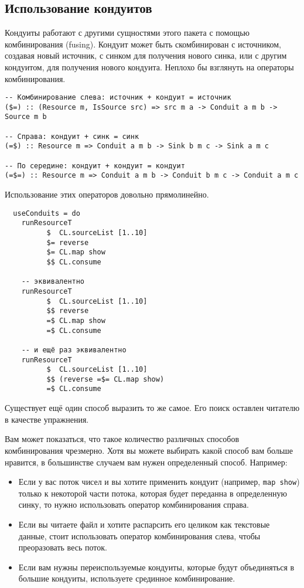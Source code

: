 \subsection{Использование кондуитов}
Кондуиты работают с другими сущностями этого пакета с помощью комбинирования (fusing).
Кондуит может быть скомбинирован с источником, создавая новый источник, 
с синком для получения нового синка, или с другим кондуитом, для получения 
нового кондуита. Неплохо бы взглянуть на операторы комбинирования. 
\begin{lstlisting}
-- Комбинирование слева: источник + кондуит = источник
($=) :: (Resource m, IsSource src) => src m a -> Conduit a m b -> Source m b

-- Справа: кондуит + синк = синк
(=$) :: Resource m => Conduit a m b -> Sink b m c -> Sink a m c

-- По середине: кондуит + кондуит = кондуит
(=$=) :: Resource m => Conduit a m b -> Conduit b m c -> Conduit a m c
\end{lstlisting}
Использование этих операторов довольно прямолинейно.
\begin{lstlisting}
  useConduits = do
    runResourceT
          $  CL.sourceList [1..10]
          $= reverse
          $= CL.map show
          $$ CL.consume

    -- эквивалентно
    runResourceT
          $  CL.sourceList [1..10]
          $$ reverse
          =$ CL.map show
          =$ CL.consume

    -- и ещё раз эквивалентно
    runResourceT
          $  CL.sourceList [1..10]
          $$ (reverse =$= CL.map show)
          =$ CL.consume
\end{lstlisting}
Существует ещё один способ выразить то же самое. Его поиск оставлен читателю
 в качестве упражнения.

Вам может показаться, что такое количество различных способов комбинирования 
чрезмерно. Хотя вы можете выбирать какой способ вам больше нравится, 
в большинстве случаем вам нужен определенный способ. Например:

\begin{itemize}   
\item Если у вас поток чисел и вы хотите применить кондуит (например, 
\lstinline'map show') только к некоторой части потока, которая будет переданна 
в определенную синку, то нужно использовать оператор комбинирования справа.
\item Если вы читаете файл и хотите распарсить его целиком как текстовые данные, 
стоит использовать оператор комбинирования слева, чтобы преоразовать весь поток.
\item Если вам нужны переиспользуемые кондуиты, которые будут объединяться в 
большие кондуиты, используете срединное комбинирование.
\end{itemize}

